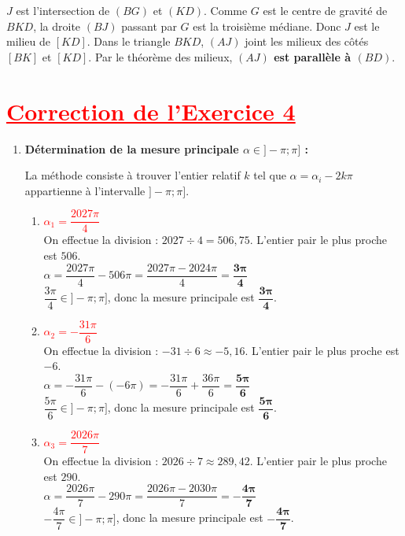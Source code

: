 \documentclass[12pt,a4paper]{article}
\begin{document}
$J$ est l'intersection de $(BG)$ et $(KD)$. Comme $G$ est le centre de gravité de $BKD$, la droite $(BJ)$ passant par $G$ est la troisième médiane. Donc $J$ est le milieu de $[KD]$.
Dans le triangle $BKD$, $(AJ)$ joint les milieux des côtés $[BK]$ et $[KD]$. 
Par le théorème des milieux, \textbf{$(AJ)$ est parallèle à $(BD)$}.
\section*{\textcolor{red}{\underline{Correction de l'Exercice 4}}}

\begin{enumerate}
    \item \textbf{Détermination de la mesure principale $\alpha \in ]-\pi ; \pi]$ :}
    
    La méthode consiste à trouver l'entier relatif $k$ tel que $\alpha = \alpha_i - 2k\pi$ appartienne à l'intervalle $]-\pi ; \pi]$.
    
    \begin{enumerate}
        \item \textcolor{red}{$\alpha_1 = \dfrac{2027\pi}{4}$} \\
        On effectue la division : $2027 \div 4 = 506,75$. L'entier pair le plus proche est $506$. \\
        $\alpha = \dfrac{2027\pi}{4} - 506\pi = \dfrac{2027\pi - 2024\pi}{4} = \mathbf{\dfrac{3\pi}{4}}$ \\
        $\dfrac{3\pi}{4} \in ]-\pi ; \pi]$, donc la mesure principale est $\mathbf{\dfrac{3\pi}{4}}$.
        
        \item \textcolor{red}{$\alpha_2 = -\dfrac{31\pi}{6}$} \\
        On effectue la division : $-31 \div 6 \approx -5,16$. L'entier pair le plus proche est $-6$. \\
        $\alpha = -\dfrac{31\pi}{6} - (-6\pi) = -\dfrac{31\pi}{6} + \dfrac{36\pi}{6} = \mathbf{\dfrac{5\pi}{6}}$ \\
        $\dfrac{5\pi}{6} \in ]-\pi ; \pi]$, donc la mesure principale est $\mathbf{\dfrac{5\pi}{6}}$.
        
        \item \textcolor{red}{$\alpha_3 = \dfrac{2026\pi}{7}$} \\
        On effectue la division : $2026 \div 7 \approx 289,42$. L'entier pair le plus proche est $290$. \\
        $\alpha = \dfrac{2026\pi}{7} - 290\pi = \dfrac{2026\pi - 2030\pi}{7} = \mathbf{-\dfrac{4\pi}{7}}$ \\
        $-\dfrac{4\pi}{7} \in ]-\pi ; \pi]$, donc la mesure principale est $\mathbf{-\dfrac{4\pi}{7}}$.
        

\end{enumerate}
\end{enumerate}
\end{document}

